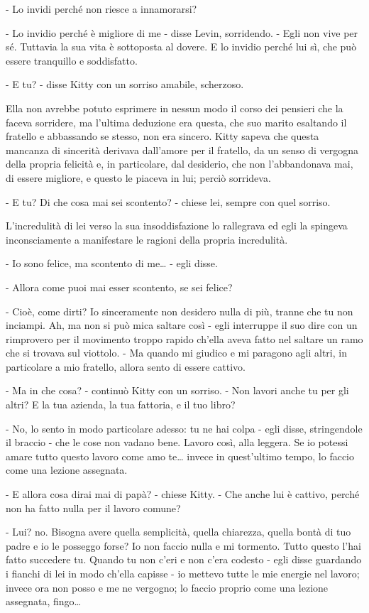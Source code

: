 - Lo invidi perché non riesce a innamorarsi? 

- Lo invidio perché è migliore di me - disse Levin, sorridendo. - Egli non vive per sé. Tuttavia la sua vita è sottoposta al dovere. E lo invidio perché lui sì, che può essere tranquillo e soddisfatto. 

- E tu? - disse Kitty con un sorriso amabile, scherzoso. 

Ella non avrebbe potuto esprimere in nessun modo il corso dei pensieri che la faceva sorridere, ma l'ultima deduzione era questa, che suo marito esaltando il fratello e abbassando se stesso, non era sincero. Kitty sapeva che questa mancanza di sincerità derivava dall'amore per il fratello, da un senso di vergogna della propria felicità e, in particolare, dal desiderio, che non l'abbandonava mai, di essere migliore, e questo le piaceva in lui; perciò sorrideva. 

- E tu? Di che cosa mai sei scontento? - chiese lei, sempre con quel sorriso. 

L'incredulità di lei verso la sua insoddisfazione lo rallegrava ed egli la spingeva inconsciamente a manifestare le ragioni della propria incredulità. 

- Io sono felice, ma scontento di me\ldots{} - egli disse. 

- Allora come puoi mai esser scontento, se sei felice? 

- Cioè, come dirti? Io sinceramente non desidero nulla di più, tranne che tu non inciampi. Ah, ma non si può mica saltare così - egli interruppe il suo dire con un rimprovero per il movimento troppo rapido ch'ella aveva fatto nel saltare un ramo che si trovava sul viottolo. - Ma quando mi giudico e mi paragono agli altri, in particolare a mio fratello, allora sento di essere cattivo. 

- Ma in che cosa? - continuò Kitty con un sorriso. - Non lavori anche tu per gli altri? E la tua azienda, la tua fattoria, e il tuo libro? 

- No, lo sento in modo particolare adesso: tu ne hai colpa - egli disse, stringendole il braccio - che le cose non vadano bene. Lavoro così, alla leggera. Se io potessi amare tutto questo lavoro come amo te\ldots{} invece in quest'ultimo tempo, lo faccio come una lezione assegnata. 

- E allora cosa dirai mai di papà? - chiese Kitty. - Che anche lui è cattivo, perché non ha fatto nulla per il lavoro comune? 

- Lui? no. Bisogna avere quella semplicità, quella chiarezza, quella bontà di tuo padre e io le posseggo forse? Io non faccio nulla e mi tormento. Tutto questo l'hai fatto succedere tu. Quando tu non c'eri e non c'era codesto - egli disse guardando i fianchi di lei in modo ch'ella capisse - io mettevo tutte le mie energie nel lavoro; invece ora non posso e me ne vergogno; lo faccio proprio come una lezione assegnata, fingo\ldots{} 


